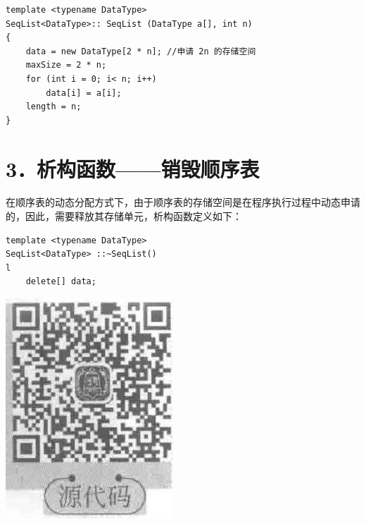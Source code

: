 \documentclass[10pt]{article}
\begin{document}
\begin{verbatim}
template <typename DataType>
SeqList<DataType>:: SeqList (DataType a[], int n)
{
    data = new DataType[2 * n]; //申请 2n 的存储空间
    maxSize = 2 * n;
    for (int i = 0; i< n; i++)
        data[i] = a[i];
    length = n;
}
\end{verbatim}

\section*{3．析构函数——销毁顺序表}
在顺序表的动态分配方式下，由于顺序表的存储空间是在程序执行过程中动态申请的，因此，需要释放其存储单元，析构函数定义如下：

\begin{verbatim}
template <typename DataType>
SeqList<DataType> ::~SeqList()
l
    delete[] data;
\end{verbatim}

\begin{center}
\includegraphics[max width=\textwidth]{2025_06_06_704745ea57b15b2333e5g-069}
\end{center}
\end{document}

